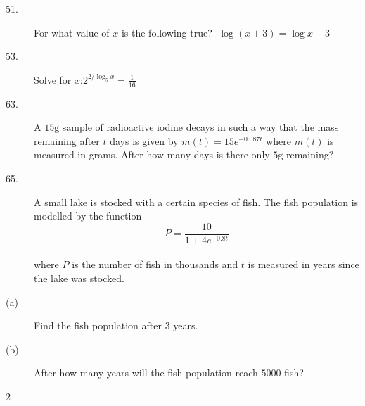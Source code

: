 \begin{description}
\item [51.]
For what value of $x$ is the following true? $\;\log  \left (x +3\right ) =\log  x +3$ 

\item [53.] Solve for $x$:\qquad $2^{2/\log _{5} x} =\frac{1}{16}$ 

\item [63.] A $15 \mbox{g}$ sample of radioactive iodine decays in such a way that the mass remaining
after $t$ days is given by $m \left (t\right ) =15 e^{ -0.087 t}$ where $m (t)$ is measured in grams. After how many days is there only $5 \mbox{g}$ remaining? 

\item [65.]
A small lake is stocked with a certain species of fish. The fish population is modelled by the function
\begin{equation*}P =\frac{10}{1 +4 e^{ -0.8 t}}
\end{equation*} \\\relax where $P$ is the number of fish in thousands and $t$ is measured in years since the lake was stocked. 

\item [(a)]
Find the fish population after $3$ years. 

\item [(b)] After how many
years will the fish population reach $5000$ fish? \end{description}


\columnsep =30pt
\begin {multicols}{2}
 


\end {multicols}

\clearpage

